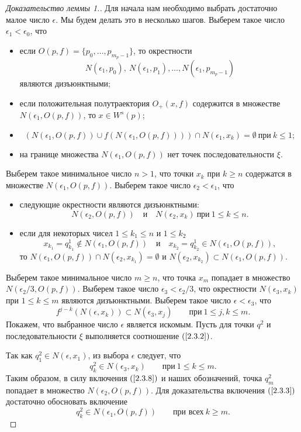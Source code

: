 \documentclass[12pt]{article}
\begin{document}
\begin{proof}[Доказательство леммы 1.] Для начала нам необходимо выбрать достаточно малое число $\epsilon$. Мы будем делать это в несколько шагов.
Выберем такое число $\epsilon_1<\epsilon_0$, что
\begin{itemize}
	\item если $O(p,f)=\{p_0,\ldots,p_{m_p-1}\}$, то окрестности $$N(\epsilon_1,p_0),\ N(\epsilon_1,p_1),\ldots, N(\epsilon_1, p_{m_p-1})$$ являются дизъюнктными;
	\item 
  если положительная полутраектория $O_{+}(x,f)$ содержится в множестве $N(\epsilon_1,O(p,f))$, 
	то $x\in W^s(p)$;
	\item 
	$$\left(N(\epsilon_1,O(p,f))\cup f(N(\epsilon_1,O(p,f)))\right)\cap N(\epsilon_1,x_k)=\emptyset\ \textrm{при}\ k\leq1;$$
  \item на границе множества $N(\epsilon_1,O(p,f))$ нет точек последовательности $\xi$.
\end{itemize}
Выберем такое минимальное число $n>1$, что точки $x_k$ при $k\geq n$ содержатся в множестве $N(\epsilon_1,O(p,f))$. 
Выберем такое число $\epsilon_2<\epsilon_1$, что 
\begin{itemize}
	\item следующие окрестности являются дизъюнктными:
$$N(\epsilon_2,O(p,f))\quad\textrm{и}\quad N(\epsilon_2,x_k)\ \textrm{при}\ 1\leq k\leq n.$$
  \item если для некоторых чисел $1\leq k_1\leq n$ и $1\leq k_2$ 
  $$x_{k_1}=q^1_{k_1}\notin N(\epsilon_1,O(p,f))\quad\textrm{и}\quad x_{k_2}=q^1_{k_2}\in N(\epsilon_1,O(p,f)),$$
  то $N(\epsilon_1,O(p,f))\cap N(\epsilon_2,x_{k_1})=\emptyset$ и $N(\epsilon_2,x_{k_2})\subset N(\epsilon_1,O(p,f))$.
\end{itemize}
Выберем такое минимальное число $m\geq n$, что
точка $x_{m}$ попадает в множество $N(\epsilon_2/3,O(p,f)).$
Выберем такое число $\epsilon_3<\epsilon_2/3$, что
окрестности $N(\epsilon_3,x_k)$  при $1\leq k\leq m$ являются дизъюнктными.
Выберем такое число $\epsilon<\epsilon_3$, что
$$f^{j-k}(N(\epsilon,x_k))\subset N(\epsilon_3,x_j)\qquad\textrm{при}\ 1\leq j,k\leq m.$$
Покажем, что выбранное число $\epsilon$ является искомым. Пусть для точки $q^2$ и последовательности $\xi$ выполняется соотношение $(\ref{2.3.2})$.

Так как 
$q^2_1\in N(\epsilon,x_1)$, из выбора $\epsilon$ следует, что 
\begin{equation}
\label{2.3.8}
q^2_k\in N(\epsilon_3,x_k)\qquad\textrm{при}\ 1\leq k\leq m.
\end{equation}
Таким образом, в силу включения $(\ref{2.3.8})$ и наших обозначений, 
точка $q^2_m$ попадает в множество $N(\epsilon_2,O(p,f))$.
Для доказательства включения $(\ref{2.3.3})$ достаточно обосновать включение
\begin{equation}
\label{2.3.9}
q^2_k\in N(\epsilon_1,O(p,f))\qquad\textrm{при всех}\ k\geq m.
\end{equation}


\end{proof}
\end{document}
